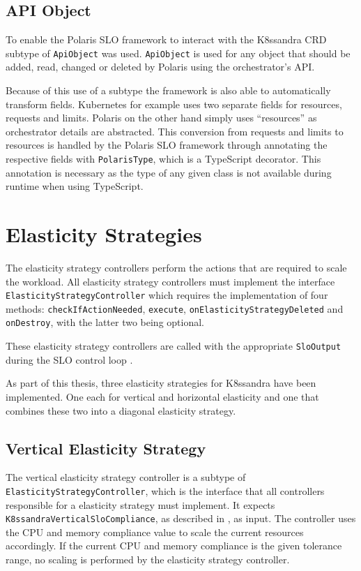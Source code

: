 \subsection{API Object}

To enable the Polaris SLO framework to interact with the K8ssandra CRD subtype of \texttt{ApiObject} was used. \texttt{ApiObject} is used for any object that should be added, read, changed or deleted by Polaris using the orchestrator's API.

Because of this use of a subtype the framework is also able to automatically transform fields. Kubernetes for example uses two separate fields for resources, requests and limits. Polaris on the other hand simply uses ``resources'' as orchestrator details are abstracted. This conversion from requests and limits to resources is handled by the Polaris SLO framework through annotating the respective fields with \texttt{PolarisType}, which is a TypeScript decorator. This annotation is necessary as the type of any given class is not available during runtime when using TypeScript.

\section{Elasticity Strategies}

The elasticity strategy controllers perform the actions that are required to scale the workload. All elasticity strategy controllers must implement the interface \texttt{Elasticity\-Strategy\-Controller} which requires the implementation of four methods: \texttt{check\-If\-Action\-Needed}, \texttt{execute}, \texttt{on\-Elasticity\-Strategy\-Deleted} and \texttt{on\-Destroy}, with the latter two being optional.

These elasticity strategy controllers are called with the appropriate \texttt{SloOutput} during the SLO control loop \cite{pusztaiNovelMiddlewareEfficiently2021a}.

As part of this thesis, three elasticity strategies for K8ssandra have been implemented. One each for vertical and horizontal elasticity and one that combines these two into a diagonal elasticity strategy.

\subsection{Vertical Elasticity Strategy}
\label{sec:vertical-elasticity}

The vertical elasticity strategy controller is a subtype of \texttt{Elasticity\-Strategy\-Controller}, which is the interface that all controllers responsible for a elasticity strategy must implement. It expects \texttt{K8ssandra\-Vertical\-Slo\-Compliance}, as described in , as input. The controller uses the CPU and memory compliance value to scale the current resources accordingly. If the current CPU and memory compliance is the given tolerance range, no scaling is performed by the elasticity strategy controller.

